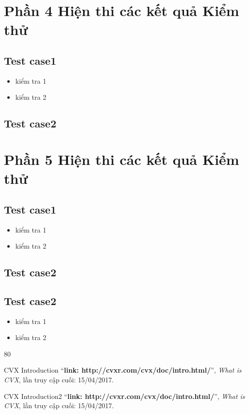 \documentclass[a4paper]{article}
\begin{document}
 \section{Phần 4 Hiện thi các kết quả Kiểm thử}
    \subsection{Test case1}
    \begin{itemize}
         \item kiểm tra 1
        \item  kiểm tra 2
    \end{itemize}


    \subsection{Test case2}



 \section{Phần 5 Hiện thi các kết quả Kiểm thử}
    \subsection{Test case1}
    \begin{itemize}
         \item kiểm tra 1
        \item  kiểm tra 2
    \end{itemize}


    \subsection{Test case2}



	\subsection{Test case2}
		\begin{itemize}
			\item kiểm tra 1
			\item  kiểm tra 2
	\end{itemize}


\begin{thebibliography}{80}

CVX Introduction
``\textbf{link: http://cvxr.com/cvx/doc/intro.html/}'',
\textit{What is CVX}, lần truy cập cuối: 15/04/2017.

CVX Introduction2
``\textbf{link: http://cvxr.com/cvx/doc/intro.html/}'',
\textit{What is CVX}, lần truy cập cuối: 15/04/2017.

\end{thebibliography}
\end{document}

